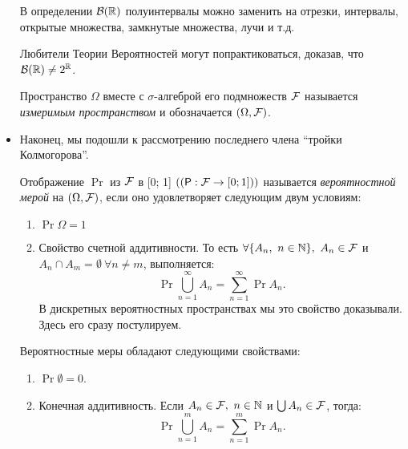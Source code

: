 \begin{itemize}
        \begin{exercise}
            В определении \(\mathcal{B}(\mathbb{R})\) полуинтервалы можно заменить на отрезки, интервалы, открытые множества, замкнутые множества, лучи и т.д.
            
            Любители Теории Вероятностей  могут попрактиковаться, доказав, что \(\mathcal{B}(\mathbb{R}) \neq 2^{\mathbb{R}}\).
            
        \end{exercise}
    
        \begin{definition}
            Пространство $ \Omega $ вместе с $ \sigma $-алгеброй его подмножеств $ \mathcal{F} $ называется \emph{измеримым пространством} и обозначается \((\Omega, \mathcal{F})\).
        \end{definition}
    
    \item Наконец, мы подошли к рассмотрению последнего члена ``тройки Колмогорова''. 
        
        \begin{definition}
            Отображение $ \Pr $ из $ \mathcal{F} $ в [0; 1] \(\left( (\Pr: \F \to [0; 1]) \right)\) называется \emph{вероятностной мерой} на \( (\Omega, \mathcal{F}) \), если оно удовлетворяет следующим двум условиям:
                \begin{enumerate}
                    \item \(\Pr{\Omega} = 1  \)
                    
                    \item Свойство счетной аддитивности. То есть \( \forall \{A_n,\ n \in \mathbb{N} \},\ A_n \in \mathcal{F}  \) и \(A_n \cap A_m = \emptyset\  \forall n \neq m \), выполняется: \[\Pr{\bigcup\limits_{n = 1}^{\infty}A_n} = \sum\limits_{n = 1}^{\infty}\Pr{A_n}.
                    \] В дискретных вероятностных пространствах мы это свойство доказывали. Здесь его сразу постулируем.
                    
                \end{enumerate} 
        \end{definition}     
       
   \begin{lemma}
        Вероятностные меры обладают следующими свойствами:
        \begin{enumerate}
            \item \(\Pr{\emptyset} = 0 \).
            
            \item Конечная аддитивность. Если \(A_n \in \mathcal{F},\ n \in \mathbb{N}  \) и \(\bigcup A_n \in \mathcal{F} \), тогда:
            \[
                \Pr{\bigcup\limits_{n = 1}^{m}A_n} = \sum\limits_{n = 1}^{m}\Pr{A_n}.
            \]
            

\end{enumerate}
\end{lemma}
\end{itemize}
